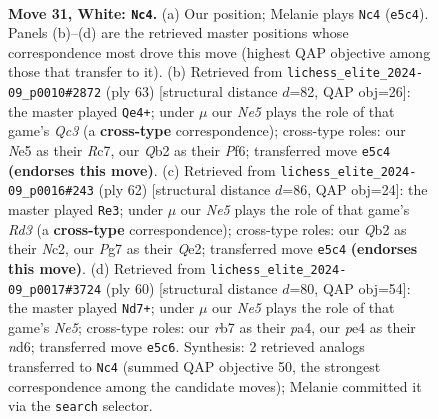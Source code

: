 \documentclass[11pt]{article}
\begin{document}
\clearpage

\begin{figure}[p]\centering
\begin{subfigure}{0.46\textwidth}\centering
\resizebox{\linewidth}{!}{%
\newchessgame
\chessboard[
  setfen={r3b1k1/pr3pP1/8/p3N3/4pq2/PP6/1Q3P2/R3R1K1 w - - 1 31},
  showmover=false,
  pgfstyle=straightmove, color=movearrow, markmove={e5-c4}
]}
\caption{}
\end{subfigure}\hfill
\begin{subfigure}{0.46\textwidth}\centering
\resizebox{\linewidth}{!}{%
\newchessgame
\chessboard[
  setfen={4r1k1/2r3pp/1pqQ1p2/p7/5P2/2P5/1P1R3P/1K4R1 b - - 2 32},
  showmover=false,
  pgfstyle=straightmove, color=movearrow, markmove={c6-e4}
]}
\caption{}
\end{subfigure}
\\[4pt]
\begin{subfigure}{0.46\textwidth}\centering
\resizebox{\linewidth}{!}{%
\newchessgame
\chessboard[
  setfen={1r2rbk1/5p2/5pp1/8/1P2p1Pq/3R4/2N1QP2/1R4K1 w - - 0 32},
  showmover=false,
  pgfstyle=straightmove, color=movearrow, markmove={d3-e3}
]}
\caption{}
\end{subfigure}\hfill
\begin{subfigure}{0.46\textwidth}\centering
\resizebox{\linewidth}{!}{%
\newchessgame
\chessboard[
  setfen={rr3k2/5p2/2pn2p1/4NpP1/p2q4/5P2/PP5Q/K3R2R w - - 2 31},
  showmover=false,
  pgfstyle=straightmove, color=movearrow, markmove={e5-d7}
]}
\caption{}
\end{subfigure}
\caption{\textbf{Move 31, White: \texttt{Nc4}.} (a) Our position; Melanie plays \texttt{Nc4} (\texttt{e5c4}). Panels (b)--(d) are the retrieved master positions whose correspondence most drove this move (highest QAP objective among those that transfer to it). (b) Retrieved from \texttt{lichess\_elite\_2024-09\_p0010\#2872} (ply 63) [structural distance $d$=82, QAP obj=26]: the master played \texttt{Qe4+}; under $\mu$ our \emph{Ne5} plays the role of that game's \emph{Qc3} (a \textbf{cross-type} correspondence); cross-type roles: our \emph{N}e5 as their \emph{R}c7, our \emph{Q}b2 as their \emph{P}f6; transferred move \texttt{e5c4} \textbf{(endorses this move)}. (c) Retrieved from \texttt{lichess\_elite\_2024-09\_p0016\#243} (ply 62) [structural distance $d$=86, QAP obj=24]: the master played \texttt{Re3}; under $\mu$ our \emph{Ne5} plays the role of that game's \emph{Rd3} (a \textbf{cross-type} correspondence); cross-type roles: our \emph{Q}b2 as their \emph{N}c2, our \emph{P}g7 as their \emph{Q}e2; transferred move \texttt{e5c4} \textbf{(endorses this move)}. (d) Retrieved from \texttt{lichess\_elite\_2024-09\_p0017\#3724} (ply 60) [structural distance $d$=80, QAP obj=54]: the master played \texttt{Nd7+}; under $\mu$ our \emph{Ne5} plays the role of that game's \emph{Ne5}; cross-type roles: our \emph{r}b7 as their \emph{p}a4, our \emph{p}e4 as their \emph{n}d6; transferred move \texttt{e5c6}. Synthesis: 2 retrieved analogs transferred to \texttt{Nc4} (summed QAP objective 50, the strongest correspondence among the candidate moves); Melanie committed it via the \texttt{search} selector.}
\label{fig:thought-m60}
\end{figure}
\end{document}
